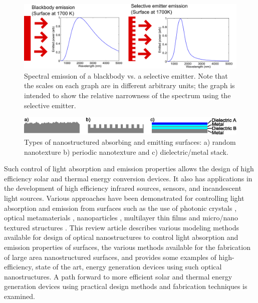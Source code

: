 \documentclass[review]{elsarticle}
\begin{document}
\begin{figure}[ht!]
	\includegraphics[width=1\textwidth]{gfig_bbs}
	\caption{\label{gfig_bbs} Spectral emission of a blackbody vs. a selective emitter.  Note that the scales on each graph are in different arbitrary units; the graph is intended to show the relative narrowness of the spectrum using the selective emitter.}
\end{figure}

\begin{figure}[ht!]
	\includegraphics[width=1\textwidth]{gfig_surfs}
	\caption{\label{gfig_surfs} Types of nanostructured absorbing and 
emitting surfaces: a) random nanotexture b) periodic nanotexture and c) dielectric/metal stack.} 
\end{figure}

Such control of light absorption and emission properties allows the design of high efficiency solar and thermal energy conversion devices. It also has applications in the development of 
high efficiency infrared sources, sensors, and incandescent light sources. 
Various approaches have been demonstrated for controlling light absorption and emission 
from surfaces such as the use of photonic crystals \cite{g11,NYL_SEMSC_2014,g13,g14}, 
optical metamaterials \cite{g15,g16,g17}, nanoparticles \cite{g18,g19,g20,g21}, 
multilayer thin films \cite{g22,RF_OptExp_2009} and micro/nano textured 
structures \cite{g25,g26,g27,g28}.  This review article describes various modeling methods 
available for design of optical nanostructures to control light absorption and emission properties of surfaces, the various methods available for the fabrication of large area nanostructured surfaces, and provides some examples of high-efficiency, state of the art, energy generation devices using such optical nanostructures.  A path forward to more efficient solar and thermal energy generation devices using practical design methods and fabrication techniques is examined.
\end{document}
